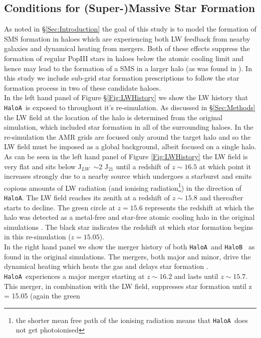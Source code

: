 \documentclass[graphics, twocolumn, usenatbib]{mn2e}
\newcommand{\JLW} {J$_{LW}$}
\newcommand{\ha} {\texttt{HaloA~}}
\newcommand{\hb} {\texttt{HaloB~}}
\newcommand{\hac} {\texttt{HaloA}}
\begin{document}
\subsection{Conditions for (Super-)Massive Star Formation}
As noted in \S \ref{Sec:Introduction} the goal of this study is to model the formation of SMS formation in haloes which are experiencing both LW feedback from nearby galaxies and dynamical heating from mergers. Both of these effects suppress the formation of regular PopIII stars in haloes
below the atomic cooling limit and hence may lead to the formation of a SMS in a larger halo (as was found in \cite{Wise_2019}). In this study we include 
sub-grid star formation prescriptions to follow the star formation process in 
two of these candidate haloes.\\
\indent In the left hand panel of Figure \S \ref{Fig:LWHistory} we show the LW history that \ha is
exposed to throughout it's re-simulation. As discussed in \S \ref{Sec:Methods} the LW field at the
location of the halo is determined from the original simulation, which included star formation
in all of the surrounding haloes. In the re-simulation the AMR grids are focused only around the
target halo and so the LW field must be imposed as a global background, albeit focused on a single
halo. As can be seen in the left hand panel of Figure \ref{Fig:LWHistory} the LW field is very flat and sits below \JLW \ $\sim 2$
J$_{21}$ until a redshift of $z \sim 16.5$ at which point it increases strongly due to a nearby source
which undergoes a starburst and emits copious amounts of LW radiation
(and ionising radiation\footnote{the
  shorter mean free path of the ionising radiation means that \ha does not get photoionised}) in the
direction of \hac. The LW field reaches its zenith at a redshift of $z \sim 15.8$ and thereafter
starts to decline. The green circle at $z = 15.6$ represents the redshift at which the halo was
detected as a metal-free and star-free atomic cooling halo in the original simulations
\citep[see][for details]{Regan_2019}. The black star indicates the redshift at which star formation begins in this
re-simulation ($z = 15.05$). \\
\indent In the right hand panel we show the merger history of both \ha and \hb
as found in the original simulations. The mergers, both major and minor, drive the dynamical heating
which heats the gas and delays star formation \citep{Wise_2019}. 
\ha experiences a major merger starting at $z \sim 16.2$ and lasts until $z \sim 15.7$. This
merger, in combination with the LW field, suppresses star formation until z = 15.05 (again the green
\end{document}

